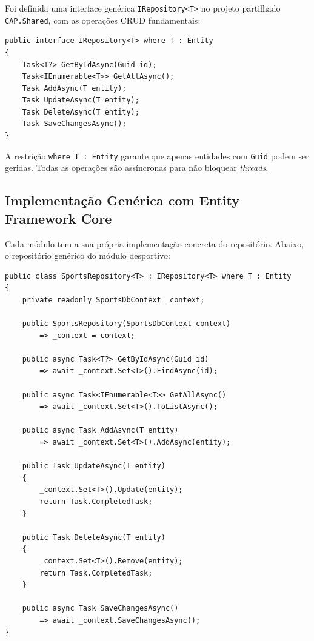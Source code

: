 Foi definida uma interface genérica \texttt{IRepository<T>} no projeto partilhado \texttt{CAP.Shared}, com as operações CRUD fundamentais:

\begin{lstlisting}[language={[Sharp]C},basicstyle=\ttfamily\small,breaklines=true,frame=single,caption={Interface genérica \texttt{IRepository<T>} partilhada por todos os módulos.},label={lst:irepository}]
public interface IRepository<T> where T : Entity
{
    Task<T?> GetByIdAsync(Guid id);
    Task<IEnumerable<T>> GetAllAsync();
    Task AddAsync(T entity);
    Task UpdateAsync(T entity);
    Task DeleteAsync(T entity);
    Task SaveChangesAsync();
}
\end{lstlisting}

A restrição \texttt{where T : Entity} garante que apenas entidades com \texttt{Guid} podem ser geridas. Todas as operações são assíncronas para não bloquear \textit{threads}.

\subsection{Implementação Genérica com Entity Framework Core}

Cada módulo tem a sua própria implementação concreta do repositório. Abaixo, o repositório genérico do módulo desportivo:

\begin{lstlisting}[language={[Sharp]C},basicstyle=\ttfamily\small,breaklines=true,frame=single,caption={Implementação genérica \texttt{SportsRepository<T>} do módulo desportivo.},label={lst:sportsrepo}]
public class SportsRepository<T> : IRepository<T> where T : Entity
{
    private readonly SportsDbContext _context;

    public SportsRepository(SportsDbContext context)
        => _context = context;

    public async Task<T?> GetByIdAsync(Guid id)
        => await _context.Set<T>().FindAsync(id);

    public async Task<IEnumerable<T>> GetAllAsync()
        => await _context.Set<T>().ToListAsync();

    public async Task AddAsync(T entity)
        => await _context.Set<T>().AddAsync(entity);

    public Task UpdateAsync(T entity)
    {
        _context.Set<T>().Update(entity);
        return Task.CompletedTask;
    }

    public Task DeleteAsync(T entity)
    {
        _context.Set<T>().Remove(entity);
        return Task.CompletedTask;
    }

    public async Task SaveChangesAsync()
        => await _context.SaveChangesAsync();
}
\end{lstlisting}

